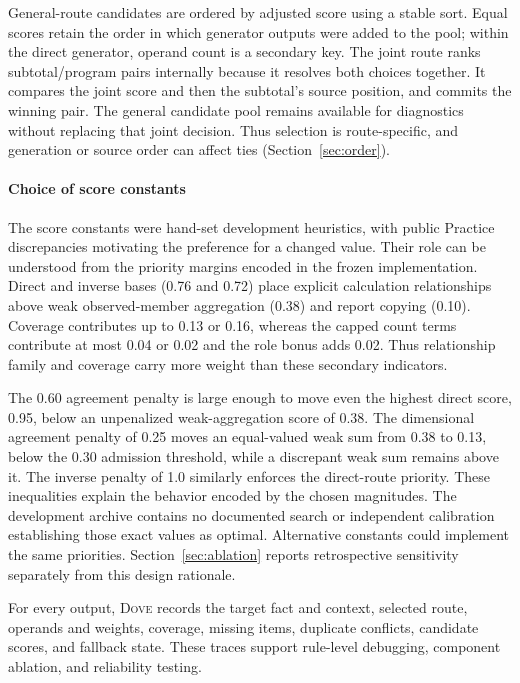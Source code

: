 \documentclass[conference]{IEEEtran}
\newcommand{\dove}{\textsc{Dove}}
\begin{document}
General-route candidates are ordered by adjusted score using a stable sort. Equal scores retain the order in which generator outputs were added to the pool; within the direct generator, operand count is a secondary key. The joint route ranks subtotal/program pairs internally because it resolves both choices together. It compares the joint score and then the subtotal's source position, and commits the winning pair. The general candidate pool remains available for diagnostics without replacing that joint decision. Thus selection is route-specific, and generation or source order can affect ties (Section~\ref{sec:order}).

\paragraph{Choice of score constants}
The score constants were hand-set development heuristics, with public Practice discrepancies motivating the preference for a changed value. Their role can be understood from the priority margins encoded in the frozen implementation. Direct and inverse bases (0.76 and 0.72) place explicit calculation relationships above weak observed-member aggregation (0.38) and report copying (0.10). Coverage contributes up to 0.13 or 0.16, whereas the capped count terms contribute at most 0.04 or 0.02 and the role bonus adds 0.02. Thus relationship family and coverage carry more weight than these secondary indicators.

The 0.60 agreement penalty is large enough to move even the highest direct score, 0.95, below an unpenalized weak-aggregation score of 0.38. The dimensional agreement penalty of 0.25 moves an equal-valued weak sum from 0.38 to 0.13, below the 0.30 admission threshold, while a discrepant weak sum remains above it. The inverse penalty of 1.0 similarly enforces the direct-route priority. These inequalities explain the behavior encoded by the chosen magnitudes. The development archive contains no documented search or independent calibration establishing those exact values as optimal. Alternative constants could implement the same priorities. Section~\ref{sec:ablation} reports retrospective sensitivity separately from this design rationale.

For every output, \dove{} records the target fact and context, selected route, operands and weights, coverage, missing items, duplicate conflicts, candidate scores, and fallback state. These traces support rule-level debugging, component ablation, and reliability testing.
\end{document}
